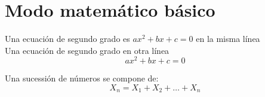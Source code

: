 \documentclass[10pt,a4paper]{article}
\begin{document}
\section{Modo matemático básico}

Una ecuación de segundo grado es
$ax^2+bx+c=0$
en la misma línea\\
Una ecuación de segundo grado en otra línea\\
$$ax^2+bx+c=0$$

Una sucessión de números se compone de:
$$ X_n = X_1 + X_2 + \ldots +X_n $$
\end{document}
